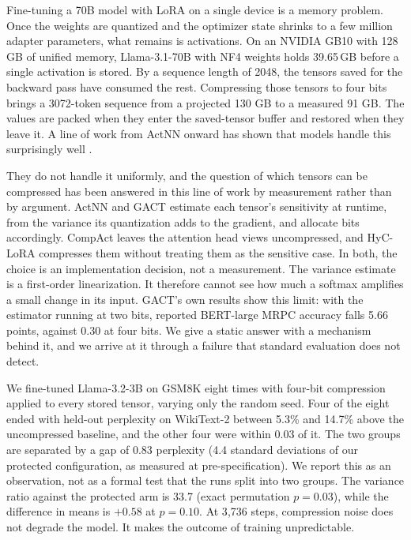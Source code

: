 \documentclass[11pt,letterpaper]{article}
\begin{document}
Fine-tuning a 70B model with LoRA on a single device is a memory problem. Once the weights are quantized and the optimizer state shrinks to a few million adapter parameters, what remains is activations. On an NVIDIA GB10 with 128\,GB of unified memory, Llama-3.1-70B with NF4 weights holds 39.65\,GB before a single activation is stored. By a sequence length of 2048, the tensors saved for the backward pass have consumed the rest. Compressing those tensors to four bits brings a 3072-token sequence from a projected 130 GB to a measured 91 GB. The values are packed when they enter the saved-tensor buffer and restored when they leave it. A line of work from ActNN onward has shown that models handle this surprisingly well \citep{chen2021actnn,liu2022gact}.

They do not handle it uniformly, and the question of which tensors can be compressed has been answered in this line of work by measurement rather than by argument. ActNN and GACT estimate each tensor's sensitivity at runtime, from the variance its quantization adds to the gradient, and allocate bits accordingly. CompAct leaves the attention head views uncompressed, and HyC-LoRA compresses them without treating them as the sensitive case. In both, the choice is an implementation decision, not a measurement. The variance estimate is a first-order linearization. It therefore cannot see how much a softmax amplifies a small change in its input. GACT's own results show this limit: with the estimator running at two bits, reported BERT-large MRPC accuracy falls 5.66 points, against 0.30 at four bits. We give a static answer with a mechanism behind it, and we arrive at it through a failure that standard evaluation does not detect.


We fine-tuned Llama-3.2-3B on GSM8K eight times with four-bit compression applied to every stored tensor, varying only the random seed. Four of the eight ended with held-out perplexity on WikiText-2 between 5.3\% and 14.7\% above the uncompressed baseline, and the other four were within 0.03 of it. The two groups are separated by a gap of 0.83 perplexity (4.4 standard deviations of our protected configuration, as measured at pre-specification). We report this as an observation, not as a formal test that the runs split into two groups. The variance ratio against the protected arm is 33.7 (exact permutation $p = 0.03$), while the difference in means is $+0.58$ at $p = 0.10$. At 3{,}736 steps, compression noise does not degrade the model. It makes the outcome of training unpredictable.
\end{document}
